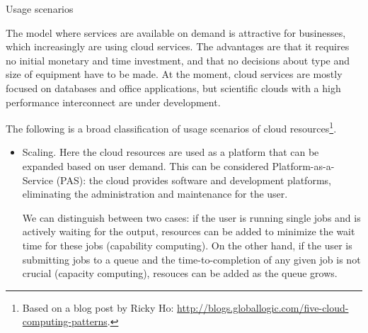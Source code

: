  {Usage scenarios}

The model where services are available on demand is attractive for
businesses, which increasingly are using cloud services. The
advantages are that it requires no initial monetary and time
investment, and that no decisions about type and size of equipment
have to be made. At the moment, cloud services are mostly focused on
databases and office applications, but scientific clouds with a high
performance interconnect are under development.

The following is a broad classification of usage scenarios of cloud
resources\footnote{Based on a blog post by Ricky Ho:
  \url{http://blogs.globallogic.com/five-cloud-computing-patterns}.}.
\begin{itemize}
\item Scaling. Here the cloud resources are used as a platform that
  can be expanded based on user demand. This can be considered
  Platform-as-a-Service (PAS): the cloud provides software and development platforms,
  eliminating the administration and maintenance for the user. 

  We can distinguish between two cases: if the user is running single
  jobs and is actively waiting for the output, resources can be added
  to minimize the wait time for these jobs (capability computing). On
  the other hand, if the user is submitting jobs to a queue and the
  time-to-completion of any given job is not crucial (capacity
  computing), resouces can be added as the queue grows.


\end{itemize}
